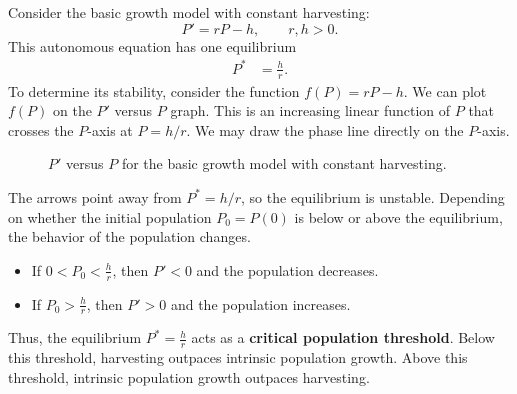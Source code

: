 \documentclass[09pt,letterpaper]{article}
\begin{document}
Consider the basic growth model with constant harvesting:
\[
P'=rP-h,
\qquad r,h>0.
\]
This autonomous equation has one equilibrium 
\begin{align*}
P^* &= \frac{h}{r}.
\end{align*}
To determine its stability, consider the function $f(P)=rP-h$. We can plot $f(P)$ on the $P'$ versus $P$ graph. This is an increasing linear function of $P$ that crosses the $P$-axis at $P=h/r$. We may draw the phase line directly on the $P$-axis.
\begin{figure}[H]
\centering
{}
\caption{$P'$ versus $P$ for the basic growth model with constant harvesting.}
\end{figure}
The arrows point away from $P^*=h/r$, so the equilibrium is unstable. Depending on whether the initial population $P_0=P(0)$ is below or above the equilibrium, the behavior of the population changes. 
\begin{itemize}
    \item If $0<P_0<\frac{h}{r}$, then $P'<0$ and the population decreases. 
    \item If $P_0>\frac{h}{r}$, then $P'>0$ and the population increases.
\end{itemize}
Thus, the equilibrium $P^*=\frac{h}{r}$ acts as a \textbf{critical population threshold}. Below this threshold, harvesting outpaces intrinsic population growth. Above this threshold, intrinsic population growth outpaces harvesting.



\end{document}

